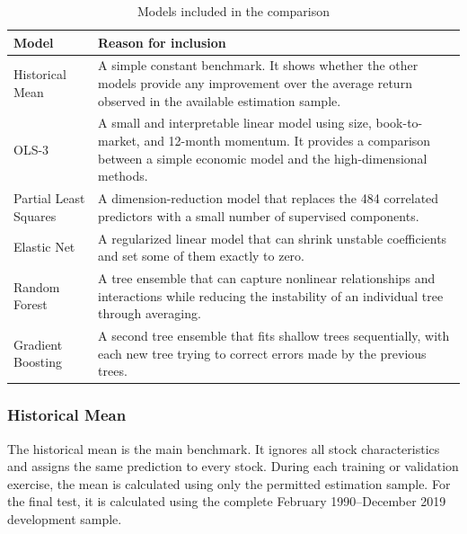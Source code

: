 \documentclass[11pt,a4paper]{article}
\begin{document}
\begin{table}[H]
\centering
\caption{Models included in the comparison}
\label{tab:model-rationale}
\small
\begin{tabularx}
{\textwidth}
{>{\raggedright\arraybackslash}p{2.8cm}X}
\toprule
Model & Reason for inclusion \\
\midrule

Historical Mean &
A simple constant benchmark. It shows whether the other models provide any
improvement over the average return observed in the available estimation
sample. \\

OLS-3 &
A small and interpretable linear model using size, book-to-market, and
12-month momentum. It provides a comparison between a simple economic model
and the high-dimensional methods. \\

Partial Least Squares &
A dimension-reduction model that replaces the 484 correlated predictors with a
small number of supervised components. \\

Elastic Net &
A regularized linear model that can shrink unstable coefficients and set some
of them exactly to zero. \\

Random Forest &
A tree ensemble that can capture nonlinear relationships and interactions while
reducing the instability of an individual tree through averaging. \\

Gradient Boosting &
A second tree ensemble that fits shallow trees sequentially, with each new tree
trying to correct errors made by the previous trees. \\

\bottomrule
\end{tabularx}
\end{table}

\subsubsection*{Historical Mean}

The historical mean is the main benchmark. It ignores all stock
characteristics and assigns the same prediction to every stock. During each
training or validation exercise, the mean is calculated using only the
permitted estimation sample. For the final test, it is calculated using the
complete February 1990--December 2019 development sample.
\end{document}
